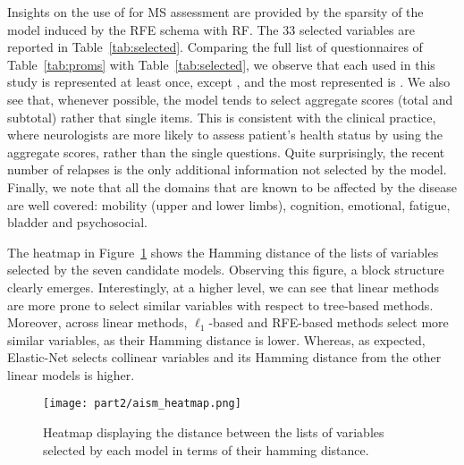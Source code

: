\begin{itemize}
	
	
	Insights on the use of \PCOs for MS assessment are provided by the sparsity of the \F model induced by the RFE schema with RF. The $33$ selected variables are reported in Table~\ref{tab:selected}.
	Comparing the full list of \PCO questionnaires of Table~\ref{tab:proms} with Table~\ref{tab:selected}, we observe that each \PCO used in this study is represented at least once, except \EDINB, and the most represented is \FIM.
	We also see that, whenever possible, the model tends to select aggregate scores (total and subtotal) rather that single items. This is consistent with the clinical practice, where neurologists are more likely to assess patient's health status by using the aggregate scores, rather than the single questions.
	Quite surprisingly, the recent number of relapses is the only additional information not selected by the model.
	Finally, we note that all the domains that are known to be affected by the disease are well covered: mobility (upper and lower limbs), cognition, emotional, fatigue, bladder and psychosocial.
	
	
	
	The heatmap in Figure~\ref{fig:selection_heatmap} shows the Hamming distance of the lists of variables selected by the seven \F candidate models. Observing this figure, a block structure clearly emerges. Interestingly, at a higher level, we can see that linear methods are more prone to select similar variables with respect to tree-based methods.
	Moreover, across linear methods, $\ell_1$-based and RFE-based methods select more similar variables, as their Hamming distance is lower.
	Whereas, as expected, Elastic-Net selects collinear variables and its Hamming distance from the other linear models is higher.
	
	\begin{figure}[]
	\centering
	\texttt{[image: part2/aism\_heatmap.png]}
	\caption{Heatmap displaying the distance between the lists of variables selected by each model in terms of their hamming distance.} \label{fig:selection_heatmap}
	\end{figure}
	

\end{itemize}
